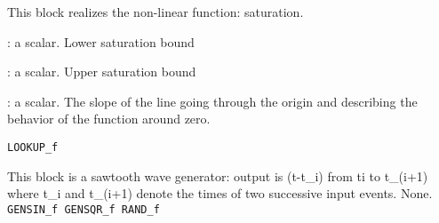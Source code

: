 \label{SATf}

This block realizes the non-linear function: saturation.
\begin{scitem}
\item[{\verb?Min?}]
: a scalar. Lower saturation bound
\item[{\verb?Max?}]
: a scalar. Upper saturation bound
\item[{\verb?Slope?}]
: a scalar. The slope of the line going through the origin 
and describing the behavior of the function around zero.
\end{scitem}%
{\verb?LOOKUP_f?} \pageref{LOOKUPf}





%
%


\label{SAWTOOTHf}

This block is a sawtooth wave generator: output is (t-t\_i)
from ti to t\_(i+1) where t\_i and t\_(i+1) denote the times of
two successive input events.
None.
{\verb?GENSIN_f GENSQR_f RAND_f?} \pageref{GENSINfGENSQRfRANDf}






%
%


\label{SCOPEf}

